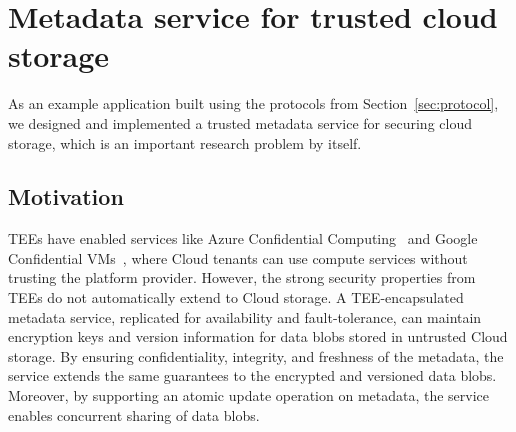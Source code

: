 \label{chap:tee}
\cleardoublepage{}




\section{Metadata service for trusted cloud storage}\label{sec:metadata}

As an example application built using the protocols from
Section~\ref{sec:protocol}, we
designed and implemented a trusted metadata service for securing
cloud storage, which is an important research problem by itself.

\subsection{Motivation}

\acp{TEE} have enabled services like Azure Confidential
Computing~\cite{azure-conf} and Google Confidential
VMs~\cite{google-confVM}, where Cloud tenants can use compute services
without trusting the platform provider.  However, the strong security
properties from \acp{TEE} do not automatically extend to Cloud storage.
%
A \ac{TEE}-encapsulated metadata service, replicated for
availability and fault-tolerance, can maintain encryption keys
and version information for data blobs stored in untrusted Cloud
storage.  By ensuring confidentiality, integrity, and freshness
of the metadata, the service extends the same guarantees to
the encrypted and versioned data blobs. Moreover, by supporting
an atomic update operation on metadata, the service enables
concurrent sharing of data blobs.

